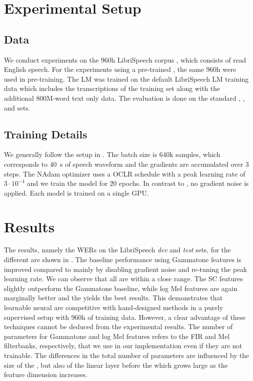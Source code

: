\documentclass{INTERSPEECH2023}
\begin{document}
\section{Experimental Setup}
\subsection{Data}
We conduct experiments on the 960h LibriSpeech corpus \cite{panayotov2015librispeech}, which consists of read English speech.
For the experiments using a pre-trained \wvtwo \fe, the same 960h were used in pre-training.
The \gls{LM} was trained on the default LibriSpeech \gls{LM} training data which includes the transcriptions of the training set along with the additional 800M-word text only data.
The evaluation is done on the standard \devclean, \devother, \testclean and \testother sets.

\subsection{Training Details}
We generally follow the setup in \cite{zhou2022efficient}.
The batch size is 640k samples, which corresponds to \SI{40}{\second} of speech waveform and the gradients are accumulated over 3 steps.
The NAdam optimizer uses a \gls{OCLR} schedule with a peak learning rate of $3\cdot 10^{-4}$ and we train the model for 20 epochs.
In contrast to \cite{zhou2022efficient}, no gradient noise is applied.
Each model is trained on a single \gls{GPU}.

\section{Results}
The results, namely the \glspl{WER} on the LibriSpeech \textit{dev} and \textit{test} sets, for the different \fes are shown in .
The baseline performance using Gammatone features is improved compared to \cite{zhou2022efficient} mainly by disabling gradient noise and re-tuning the peak learning rate.
We can observe that all \fes are within a close range.
The \gls{SC} features slightly outperform the Gammatone baseline, while log Mel features are again marginally better and the \wvtwo \fe yields the best results.
This demonstrates that learnable neural \fes are competitive with hand-designed methods in a purely supervised setup with 960h of training data.
However, a clear advantage of these techniques cannot be deduced from the experimental results.
The number of parameters for Gammatone and log Mel features refers to the \gls{FIR} and Mel filterbanks, respectively, that we use in our implementation even if they are not trainable.
The differences in the total number of parameters are influenced by the size of the \fe, but also of the linear layer before the \conformer which grows large as the feature dimension increases.

\end{document}
